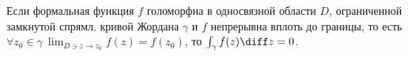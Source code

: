 \begin{theorem}
  Если формальная функция $f$ голоморфна в односвязной области $D$, ограниченной замкнутой спрямл. кривой Жордана $\gamma$ и $f$ непрерывна вплоть до границы, то есть $\forall  z_0 \in \gamma \ \lim_{D \ni z \rightarrow z_0}f(z) = f(z_0)$, то $\int_{\gamma}f(z)\diff z = 0$.
\end{theorem}


